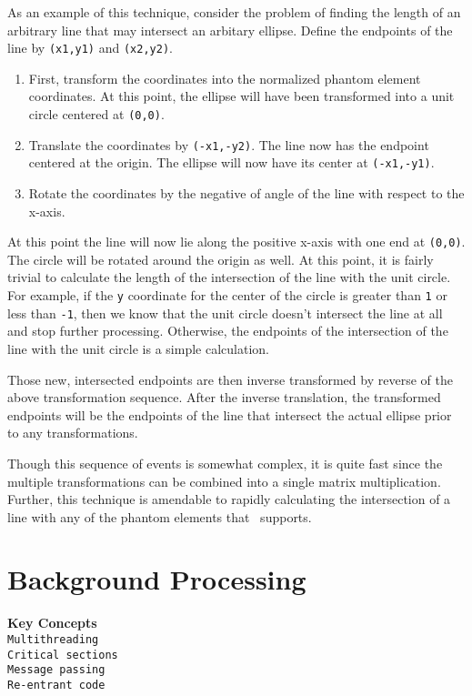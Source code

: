 As an example of this technique, consider the problem of finding
the length of an arbitrary line that may intersect an arbitary
ellipse. Define the endpoints of the line by \texttt{(x1,y1)} and
\texttt{(x2,y2)}.

\begin{enumerate}
\item First, transform the coordinates into the normalized
phantom element coordinates. At this point, the ellipse will have
been transformed into a unit circle centered at \texttt{(0,0)}.
\item Translate the
coordinates by \texttt{(-x1,-y2)}. The line now has the endpoint
centered at the origin. The ellipse will now have its center at
\texttt{(-x1,-y1)}.
\item Rotate the coordinates by the negative of angle of the line
with respect to the x-axis.
\end{enumerate}

At this point the line will now lie along the positive x-axis with
one end at \texttt{(0,0)}. The circle will be rotated around the
origin as well. At this point, it is fairly trivial to calculate
the length of the intersection of the line with the unit circle.
For example, if the \texttt{y} coordinate for the center of the
circle is greater than \texttt{1} or less than \texttt{-1}, then
we know that the unit circle doesn't intersect the line at all and
stop further processing. Otherwise, the endpoints of the
intersection of the line with the unit circle is a simple
calculation.

Those new, intersected endpoints are then inverse transformed by
reverse of the above transformation sequence. After the inverse
translation, the transformed endpoints will be the endpoints of
the line that intersect the actual ellipse prior to any
transformations.

Though this sequence of events is somewhat complex, it is quite
fast since the multiple transformations can be combined into a
single matrix multiplication. Further, this technique is amendable
to rapidly calculating the intersection of a line with any of the
phantom elements that \ctsim\ supports.

\section{Background Processing}\label{backgroundprocessing}
\textbf{Key Concepts}\\
\hspace*{1cm}\texttt{Multithreading}\\
\hspace*{1cm}\texttt{Critical sections}\\
\hspace*{1cm}\texttt{Message passing}\\
\hspace*{1cm}\texttt{Re-entrant code}\\

